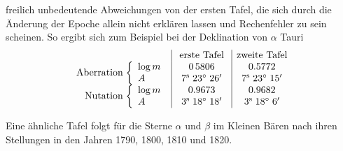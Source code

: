 freilich unbedeutende Abweichungen von der ersten Tafel, die sich durch die Änderung der Epoche allein nicht erklären lassen und Rechenfehler zu sein scheinen. So ergibt sich zum Beispiel bei der Deklination von $\alpha$ Tauri \[ \begin{array}{r@{}l|c|c} \multicolumn{2}{c|}{} & \text{erste Tafel} & \text{zweite Tafel}\\ \text{Aberration}\; & \left\{\begin{array}{l}\log m\\ A\end{array}\right. & \begin{array}{c}0\,5806\\7^{\mathrm s}\;23^\circ\;26'\end{array} & \begin{array}{c}0.5772\\7^{\mathrm s}\;23^\circ\;15'\end{array}\\ \text{Nutation}\; & \left\{\begin{array}{l}\log m\\ A\end{array}\right. & \begin{array}{c}0.9673\\3^{\mathrm s}\;18^\circ\;18'\end{array} & \begin{array}{c}0.9682\\3^{\mathrm s}\;18^\circ\;6'\end{array} \end{array} \]

Eine ähnliche Tafel folgt für die Sterne $\alpha$ und $\beta$ im Kleinen Bären nach ihren Stellungen in den Jahren 1790, 1800, 1810 und 1820.

